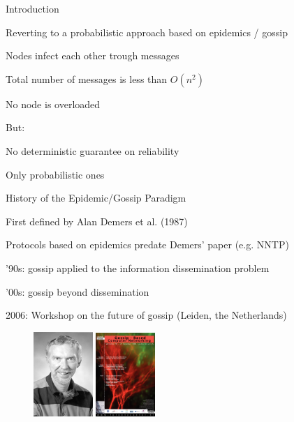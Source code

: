 \begin{frame}{Introduction}
	

\BIL
\item Reverting to a probabilistic approach based on \alert{epidemics} / \alert{gossip}	
\item Nodes \alert{infect} each other trough messages
\item Total number of messages is less than $O(n^2)$
\item No node is overloaded
\EIL

But:

\BIL
\item No deterministic guarantee on reliability
\item Only probabilistic ones
\EIL

\end{frame}

\begin{frame}{History of the Epidemic/Gossip Paradigm}
	
\BIL
\item First defined by Alan Demers et al. (1987)
\item Protocols based on epidemics predate Demers' paper (e.g. NNTP)
\item '90s: gossip applied to the information dissemination problem
\item '00s: gossip beyond dissemination
\item 2006: Workshop on the future of gossip (Leiden, the Netherlands)
\EIL	
	
\begin{figure}
\includegraphics[width=0.20\textwidth]{demers}	
\qquad
\includegraphics[width=0.20\textwidth]{poster}	
\end{figure}
	
\end{frame}

